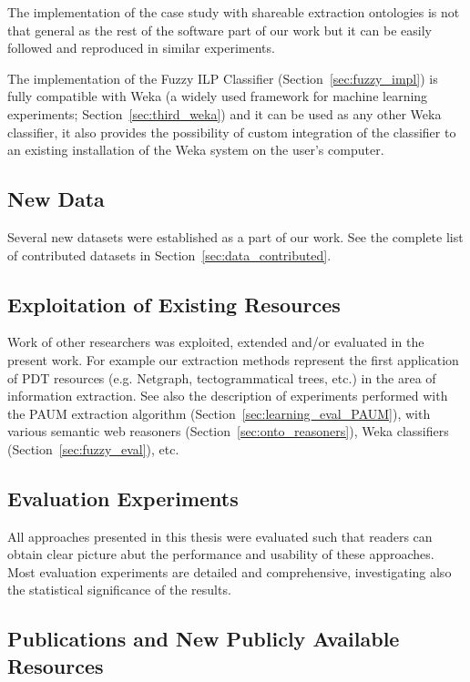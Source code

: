 The implementation of the case study with shareable extraction ontologies is not that general as the rest of the software part of our work but it can be easily followed and reproduced in similar experiments.

The implementation of the Fuzzy ILP Classifier (Section~\ref{sec:fuzzy_impl}) is fully compatible with Weka (a widely used framework for machine learning experiments; Section~\ref{sec:third_weka}) and it can be used as any other Weka classifier, it also provides the possibility of custom integration of the classifier to an existing installation of the Weka system on the user's computer.

\subsection{New Data}

Several new datasets were established as a part of our work. See the complete list of contributed datasets in Section~\ref{sec:data_contributed}.

\subsection{Exploitation of Existing Resources}

Work of other researchers was exploited, extended and/or evaluated in the present work. For example our extraction methods represent the first application of PDT resources (e.g. Netgraph, tectogrammatical trees, etc.) in the area of information extraction. See also the description of experiments performed with the PAUM extraction algorithm (Section~\ref{sec:learning_eval_PAUM}), with various semantic web reasoners (Section~\ref{sec:onto_reasoners}), Weka classifiers (Section~\ref{sec:fuzzy_eval}), etc.

\subsection{Evaluation Experiments}

All approaches presented in this thesis were evaluated such that readers can obtain clear picture abut the performance and usability of these approaches. Most evaluation experiments are detailed and comprehensive, investigating also the statistical significance of the results.

\subsection{Publications and New Publicly Available Resources}

